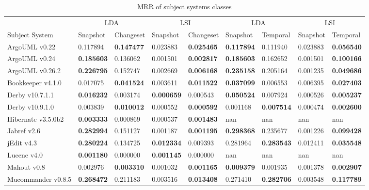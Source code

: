 \begin{table*}[ht]
\renewcommand{\arraystretch}{1.3}
\footnotesize
\centering
\caption{MRR of subject systems classes}
\begin{tabular}{l|ll|ll||ll|ll}
    \toprule
                        & \multicolumn{2}{c|}{LDA}      &  \multicolumn{2}{c||}{LSI}    & \multicolumn{2}{c|}{LDA}      &  \multicolumn{2}{c}{LSI}  \\
    Subject System      & Snapshot      & Changeset     & Snapshot      & Changeset     & Snapshot      & Temporal      & Snapshot      & Temporal  \\
    \midrule
ArgoUML v0.22  & 0.117894 & {\bf 0.147477 } & 0.023883 & {\bf 0.025465 } & {\bf 0.117894 } & 0.111940 & 0.023883 & {\bf 0.056540 } \\
ArgoUML v0.24  & {\bf 0.185603 } & 0.136062 & 0.001501 & {\bf 0.002817 } & {\bf 0.185603 } & 0.162652 & 0.001501 & {\bf 0.100166 } \\
ArgoUML v0.26.2  & {\bf 0.226795 } & 0.152747 & 0.002669 & {\bf 0.006168 } & {\bf 0.235158 } & 0.205164 & 0.001235 & {\bf 0.049686 } \\
Bookkeeper v4.1.0  & 0.017075 & {\bf 0.041524 } & 0.003611 & {\bf 0.011522 } & {\bf 0.037099 } & 0.006553 & 0.006395 & {\bf 0.027403 } \\
Derby v10.7.1.1  & {\bf 0.016232 } & 0.003174 & {\bf 0.000659 } & 0.000543 & {\bf 0.050524 } & 0.007924 & 0.000526 & {\bf 0.005237 } \\
Derby v10.9.1.0  & 0.003839 & {\bf 0.010012 } & 0.000552 & {\bf 0.000592 } & 0.001168 & {\bf 0.007514 } & 0.000474 & {\bf 0.002600 } \\
Hibernate v3.5.0b2  & {\bf 0.003333 } & 0.000869 & 0.000537 & {\bf 0.001483 } & nan & nan & nan & nan \\
Jabref v2.6  & {\bf 0.282994 } & 0.151127 & 0.001187 & {\bf 0.001195 } & {\bf 0.298368 } & 0.235677 & 0.001226 & {\bf 0.099428 } \\
jEdit v4.3  & {\bf 0.280224 } & 0.134725 & {\bf 0.012334 } & 0.009393 & 0.281964 & {\bf 0.283543 } & 0.012411 & {\bf 0.035548 } \\
Lucene v4.0  & {\bf 0.001180 } & 0.000000 & {\bf 0.001145 } & 0.000000 & nan & nan & nan & nan \\
Mahout v0.8  & 0.002976 & {\bf 0.003310 } & 0.001032 & {\bf 0.001165 } & {\bf 0.009379 } & 0.001935 & 0.001378 & {\bf 0.002907 } \\
Mucommander v0.8.5  & {\bf 0.268472 } & 0.211183 & 0.003516 & {\bf 0.013408 } & 0.271410 & {\bf 0.282706 } & 0.003548 & {\bf 0.117789 } \\

\end{tabular}
\end{table*}
